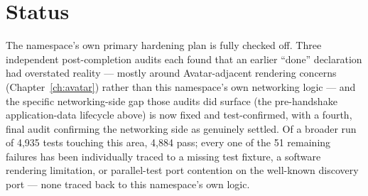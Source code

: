 \section{Status}

The namespace's own primary hardening plan is fully checked off. Three independent
post-completion audits each found that an earlier ``done'' declaration had overstated
reality --- mostly around Avatar-adjacent rendering concerns (Chapter~\ref{ch:avatar}) rather
than this namespace's own networking logic --- and the specific networking-side gap those
audits did surface (the pre-handshake application-data lifecycle above) is now fixed and
test-confirmed, with a fourth, final audit confirming the networking side as genuinely
settled. Of a broader run of 4{,}935 tests touching this area, 4{,}884 pass; every one of the
51 remaining failures has been individually traced to a missing test fixture, a software
rendering limitation, or parallel-test port contention on the well-known discovery port ---
none traced back to this namespace's own logic.
